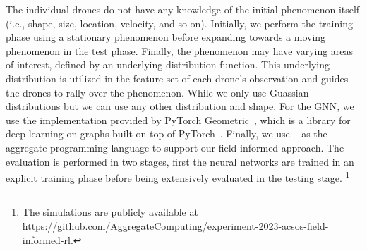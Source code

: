  The individual drones do not have any knowledge of the initial phenomenon itself (i.e., shape, size, location, velocity, and so on).
Initially, 
  we perform the training phase using a stationary phenomenon before expanding towards a moving phenomenon in the test phase. 
  Finally, the phenomenon may have varying areas of interest, defined by an underlying distribution function. 
  This underlying distribution is utilized in the feature set of each drone's observation and guides the drones to rally over the phenomenon. 
  While we only use Guassian distributions but we can use any other distribution and shape. 
For the \ac{GNN}, we use the implementation provided by PyTorch Geometric~\cite{DBLP:journals/corr/abs-1903-02428}, 
 which is a library for deep learning on graphs built on top of PyTorch~\cite{torch}.
Finally, we use \scafi{}~\cite{casadei2022scafi} as the aggregate programming language to support our field-informed approach.
%
The evaluation is performed in two stages, 
 first the neural networks are trained in an explicit training phase before being extensively evaluated in the testing stage.
\footnote{The simulations are publicly available at \url{https://github.com/AggregateComputing/experiment-2023-acsos-field-informed-rl}.}
